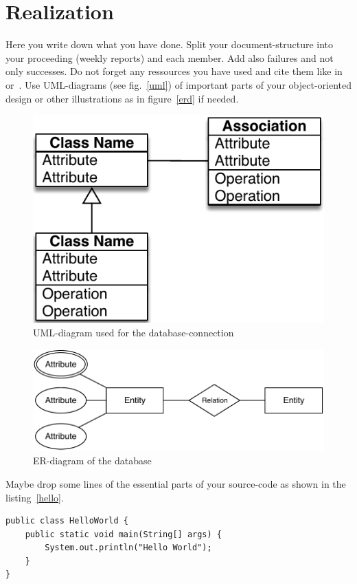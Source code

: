 \documentclass{scrreprt}
\begin{document}
\chapter{Realization}
Here you write down what you have done.
Split your document-structure into your proceeding (weekly reports) and each member.
Add also failures and not only successes.
Do not forget any ressources you have used and cite them like in~\cite{example:article} or~\cite{example:url}.
Use UML-diagrams (see fig.~\vref{uml}) of important parts of your object-oriented design or other illustrations as in figure~\vref{erd} if needed.
\begin{figure}
    \centering
    \includegraphics[scale=0.8]{includes/uml}
    \caption{UML-diagram used for the database-connection}
    \label{uml}
\end{figure}
\begin{figure}
    \centering
    \includegraphics{includes/erd}
    \caption{ER-diagram of the database}
    \label{erd}
\end{figure}%
Maybe drop some lines of the essential parts of your source-code as shown in the listing~\vref{hello}.
\begin{lstlisting}[caption={Hello World example in Java}, label={hello}]
public class HelloWorld {
	public static void main(String[] args) {
		System.out.println("Hello World");
	}
}
\end{lstlisting}
\end{document}

